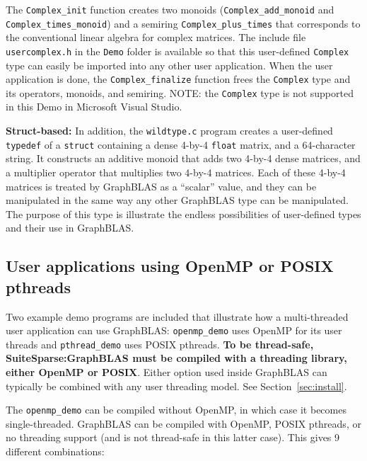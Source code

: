 \documentclass[12pt]{article}
\begin{document}
The \verb'Complex_init' function creates two monoids (\verb'Complex_add_monoid'
and \verb'Complex_times_monoid') and a semiring \verb'Complex_plus_times' that
corresponds to the conventional linear algebra for complex matrices.  The
include file \verb'usercomplex.h' in the \verb'Demo' folder is available so
that this user-defined \verb'Complex' type can easily be imported into any
other user application.  When the user application is done, the
\verb'Complex_finalize' function frees the \verb'Complex' type and its
operators, monoids, and semiring.
NOTE: the \verb'Complex' type is not supported in this Demo in Microsoft
Visual Studio.

{\bf Struct-based:}
In addition, the \verb'wildtype.c' program  creates a user-defined
\verb'typedef' of a \verb'struct' containing a dense 4-by-4 \verb'float'
matrix, and a 64-character string.  It constructs an additive monoid that adds
two 4-by-4 dense matrices, and a multiplier operator that multiplies two 4-by-4
matrices.  Each of these 4-by-4 matrices is treated by GraphBLAS as a
``scalar'' value, and they can be manipulated in the same way any other
GraphBLAS type can be manipulated. The purpose of this type is illustrate the
endless possibilities of user-defined types and their use in GraphBLAS.

\newpage
\subsection{User applications using OpenMP or POSIX pthreads}
\label{threads}

Two example demo programs are included that illustrate how a multi-threaded
user application can use GraphBLAS:  \verb'openmp_demo' uses OpenMP for its
user threads and \verb'pthread_demo' uses POSIX pthreads.
{\bf To be thread-safe, SuiteSparse:GraphBLAS must be compiled with a threading
library, either OpenMP or POSIX}.  Either option used inside GraphBLAS can
typically be combined with any user threading model.  See
Section~\ref{sec:install}.

The \verb'openmp_demo' can be compiled without OpenMP, in which case it
becomes single-threaded.  GraphBLAS can be compiled with OpenMP, POSIX
pthreads, or no threading support (and is not thread-safe in this latter
case).  This gives 9 different combinations:
\end{document}
